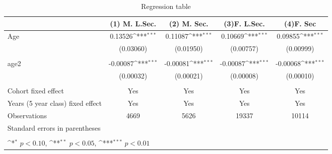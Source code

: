\begin{table}[htbp]\centering
    \def\sym#1{\ifmmode^{#1}\else\(^{#1}\)\fi}
    \caption{Regression table \label{reg2}}
    \begin{tabular}{l*{4}{c}}
    \hline
                        &\multicolumn{1}{c}{(1) M. L.Sec.}\label{2.a_m_ls}         &\multicolumn{1}{c}{(2) M.
                        Sec.}\label{2.a_m_s}        &\multicolumn{1}{c}{(3)F. L.Sec.}\label{2.a_f_ls}        &\multicolumn{1}{c}{(4)F.
                        Sec}\label{2.a_f_s}
                        \\
    \hline
    Age                 &     0.13526\sym{***}&     0.11087\sym{***}&     0.10669\sym{***}&     0.09855\sym{***}\\
                        &   (0.03060)         &   (0.01950)         &   (0.00757)         &   (0.00999)         \\
    \\
    age2                &    -0.00087\sym{***}&    -0.00081\sym{***}&    -0.00087\sym{***}&    -0.00068\sym{***}\\
                        &   (0.00032)         &   (0.00021)         &   (0.00008)         &   (0.00010)         \\
    \\
    Cohort fixed effect           &       Yes        &       Yes      & Yes & Yes  \\
    Years (5 year class) fixed effect             &       Yes       &       Yes      & Yes  & Yes   \\
    \hline
    Observations        &        4669         &        5626         &       19337         &       10114         \\
    \hline
    \multicolumn{5}{l}{\footnotesize Standard errors in parentheses}\\
    \multicolumn{5}{l}{\footnotesize }\\
    \multicolumn{5}{l}{\footnotesize \sym{*} \(p<0.10\), \sym{**} \(p<0.05\), \sym{***} \(p<0.01\)}\\
    \end{tabular}
    \end{table}
    